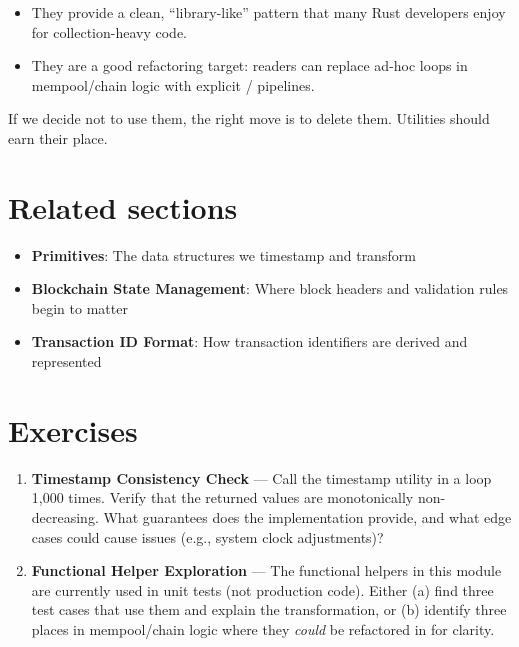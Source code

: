 \begin{itemize}
  \item They provide a clean, ``library-like'' pattern that many Rust developers enjoy for collection-heavy code.
  \item They are a good refactoring target: readers can replace ad-hoc loops in mempool/chain logic with explicit  /  pipelines.
\end{itemize}

If we decide not to use them, the right move is to delete them. Utilities should earn
their place.

\section{Related sections}
\label{sec:ch07-related}

\begin{itemize}
  \item \textbf{Primitives}: The data structures we timestamp and transform
  \item \textbf{Blockchain State Management}: Where block headers and validation rules begin to matter
  \item \textbf{Transaction ID Format}: How transaction identifiers are derived and represented
\end{itemize}

\section{Exercises}
\label{sec:ch07-exercises}

\begin{enumerate}
  \item \textbf{Timestamp Consistency Check} --- Call the timestamp utility in a loop 1,000 times. Verify that the returned values are monotonically non-decreasing. What guarantees does the implementation provide, and what edge cases could cause issues (e.g., system clock adjustments)?

  \item \textbf{Functional Helper Exploration} --- The functional helpers in this module are currently used in unit tests (not production code). Either (a) find three test cases that use them and explain the transformation, or (b) identify three places in mempool/chain logic where they \emph{could} be refactored in for clarity.
\end{enumerate}

